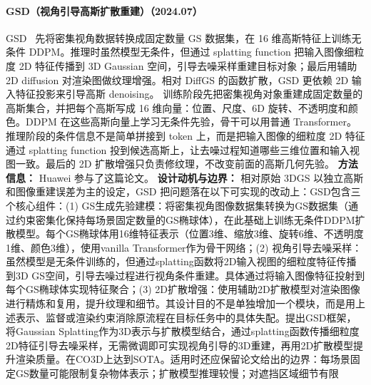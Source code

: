 \paragraph{GSD（视角引导高斯扩散重建）（2024.07）}
GSD~\cite{2407_04237} 先将密集视角数据转换成固定数量 GS 数据集，在 16 维高斯特征上训练无条件 DDPM。推理时虽然模型无条件，但通过 splatting function 把输入图像细粒度 2D 特征传播到 3D Gaussian 空间，引导去噪采样重建目标对象；最后用辅助 2D diffusion 对渲染图做纹理增强。相对 DiffGS 的函数扩散，GSD 更依赖 2D 输入特征投影来引导高斯 denoising。
训练阶段先把密集视角对象重建成固定数量的高斯集合，并把每个高斯写成 16 维向量：位置、尺度、6D 旋转、不透明度和颜色。DDPM 在这些高斯向量上学习无条件先验，骨干可以用普通 Transformer。推理阶段的条件信息不是简单拼接到 token 上，而是把输入图像的细粒度 2D 特征通过 splatting function 投到候选高斯上，让去噪过程知道哪些三维位置和输入视图一致。最后的 2D 扩散增强只负责修纹理，不改变前面的高斯几何先验。
\textbf{方法信息：} Huawei 参与了这篇论文。
\textbf{设计动机与边界：} 相对原始 3DGS 以独立高斯和图像重建误差为主的设定，GSD 把问题落在以下可实现的改动上：GSD包含三个核心组件：(1) GS生成先验建模：将密集视角图像数据集转换为GS数据集（通过约束密集化保持每场景固定数量的GS椭球体），在此基础上训练无条件DDPM扩散模型。每个GS椭球体用16维特征表示（位置3维、缩放3维、旋转6维、不透明度1维、颜色3维），使用vanilla Transformer作为骨干网络；(2) 视角引导去噪采样：虽然模型是无条件训练的，但通过splatting函数将2D输入视图的细粒度特征传播到3D GS空间，引导去噪过程进行视角条件重建。具体通过将输入图像特征投射到每个GS椭球体实现特征聚合；(3) 2D扩散增强：使用辅助2D扩散模型对渲染图像进行精炼和复用，提升纹理和细节。其设计目的不是单独增加一个模块，而是用上述表示、监督或渲染约束消除原流程在目标任务中的具体失配。提出GSD框架，将Gaussian Splatting作为3D表示与扩散模型结合，通过splatting函数传播细粒度2D特征引导去噪采样，无需微调即可实现视角引导的3D重建，再用2D扩散模型提升渲染质量。在CO3D上达到SOTA。适用时还应保留论文给出的边界：每场景固定GS数量可能限制复杂物体表示；扩散模型推理较慢；对遮挡区域细节有限
